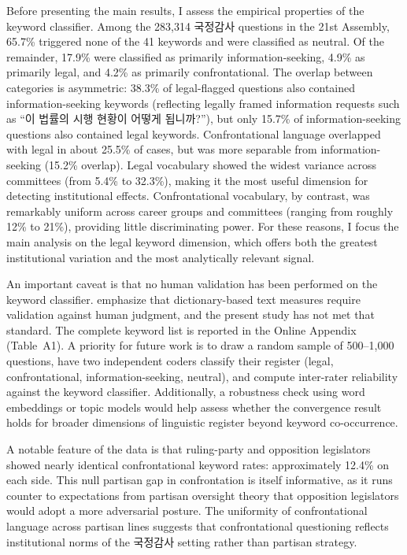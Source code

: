 \documentclass[11pt]{article}
\begin{document}
Before presenting the main results, I assess the empirical properties of the keyword classifier. Among the 283,314 국정감사 questions in the 21st Assembly, 65.7\% triggered none of the 41 keywords and were classified as neutral. Of the remainder, 17.9\% were classified as primarily information-seeking, 4.9\% as primarily legal, and 4.2\% as primarily confrontational. The overlap between categories is asymmetric: 38.3\% of legal-flagged questions also contained information-seeking keywords (reflecting legally framed information requests such as ``이 법률의 시행 현황이 어떻게 됩니까?''), but only 15.7\% of information-seeking questions also contained legal keywords. Confrontational language overlapped with legal in about 25.5\% of cases, but was more separable from information-seeking (15.2\% overlap). Legal vocabulary showed the widest variance across committees (from 5.4\% to 32.3\%), making it the most useful dimension for detecting institutional effects. Confrontational vocabulary, by contrast, was remarkably uniform across career groups and committees (ranging from roughly 12\% to 21\%), providing little discriminating power. For these reasons, I focus the main analysis on the legal keyword dimension, which offers both the greatest institutional variation and the most analytically relevant signal.

An important caveat is that no human validation has been performed on the keyword classifier. \citet{grimmer2022} emphasize that dictionary-based text measures require validation against human judgment, and the present study has not met that standard. The complete keyword list is reported in the Online Appendix (Table~A1). A priority for future work is to draw a random sample of 500--1,000 questions, have two independent coders classify their register (legal, confrontational, information-seeking, neutral), and compute inter-rater reliability against the keyword classifier. Additionally, a robustness check using word embeddings or topic models would help assess whether the convergence result holds for broader dimensions of linguistic register beyond keyword co-occurrence.

A notable feature of the data is that ruling-party and opposition legislators showed nearly identical confrontational keyword rates: approximately 12.4\% on each side. This null partisan gap in confrontation is itself informative, as it runs counter to expectations from partisan oversight theory that opposition legislators would adopt a more adversarial posture. The uniformity of confrontational language across partisan lines suggests that confrontational questioning reflects institutional norms of the 국정감사 setting rather than partisan strategy.
\end{document}
